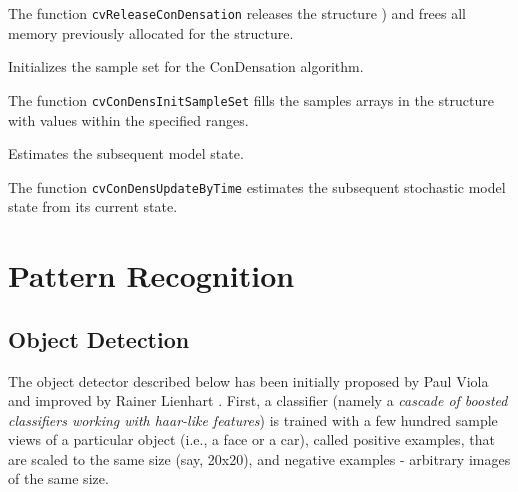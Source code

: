The function \texttt{cvReleaseConDensation} releases the structure ) and frees all memory previously allocated for the structure.

\label{ConDensInitSampleSet}

Initializes the sample set for the ConDensation algorithm.


\begin{description}
\end{description}

The function \texttt{cvConDensInitSampleSet} fills the samples arrays in the structure  with values within the specified ranges.

\label{ConDensUpdateByTime}

Estimates the subsequent model state.


\begin{description}
\end{description}

The function \texttt{cvConDensUpdateByTime} estimates the subsequent stochastic model state from its current state.
\fi

\section{Pattern Recognition}

\subsection{Object Detection}

The object detector described below has been initially proposed by Paul Viola
and improved by Rainer Lienhart
. First, a classifier (namely a \emph{cascade of boosted classifiers working with haar-like features}) is trained with a few hundred sample views of a particular object (i.e., a face or a car), called positive examples, that are scaled to the same size (say, 20x20), and negative examples - arbitrary images of the same size.

